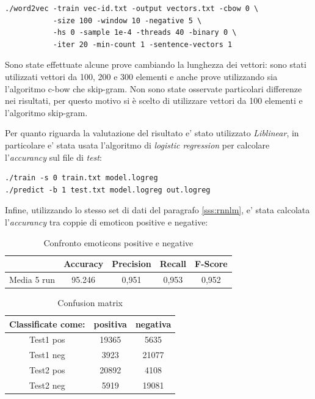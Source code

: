 \documentclass[a4paper,12pt,openright,twoside]{report}
\theoremstyle{definition}
\begin{document}
\begin{verbatim}
./word2vec -train vec-id.txt -output vectors.txt -cbow 0 \
           -size 100 -window 10 -negative 5 \
           -hs 0 -sample 1e-4 -threads 40 -binary 0 \
           -iter 20 -min-count 1 -sentence-vectors 1
\end{verbatim}

Sono state effettuate alcune prove cambiando la lunghezza dei vettori: sono stati utilizzati vettori da 100, 200 e 300 elementi e anche prove
utilizzando sia l'algoritmo c-bow che skip-gram. 
Non sono state osservate particolari differenze nei risultati, per questo motivo si è scelto di utilizzare vettori da 100 elementi e l'algoritmo skip-gram.

Per quanto riguarda la valutazione del risultato e' stato utilizzato \emph{Liblinear}, in particolare e' stata usata l'algoritmo
di \emph{logistic regression} per calcolare l'\emph{accurancy} sul file di \emph{test}:

\begin{verbatim}
./train -s 0 train.txt model.logreg
./predict -b 1 test.txt model.logreg out.logreg
\end{verbatim}

Infine, utilizzando lo stesso set di dati del paragrafo \ref{sss:rnnlm}, e' stata calcolata l'\emph{accurancy} tra coppie di emoticon positive e negative:

\begin{table}[H]
\begin{center}
\begin{tabular}{|c|c|c|c|c|}
\hline
 & Accuracy & Precision & Recall & F-Score\\
\hline
Media 5 run & 95.246 &  0,951 & 0,953 & 0,952 \\
\hline
\end{tabular}
\end{center}
\caption{Confronto emoticons positive e negative}
\label{tab:wposNeg}
\end{table}

\begin{table}[H]
\begin{center}
\begin{tabular}{|c|c|c|}
\hline
 Classificate come: & positiva & negativa \\
\hline
Test1 pos & 19365 & 5635 \\
\hline
Test1 neg & 3923 & 21077 \\
\hline
\hline
Test2 pos & 20892 & 4108 \\
\hline
Test2 neg & 5919 & 19081 \\
\hline
\end{tabular}
\end{center}
\caption{Confusion matrix}
\label{tab:word2vecconfusion}
\end{table}
\end{document}
